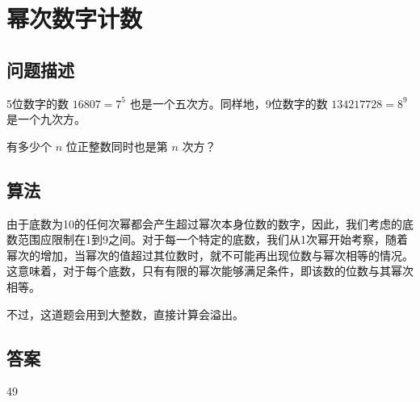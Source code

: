 \section{幂次数字计数}\label{sec:problem63}
\subsection{问题描述}
\begin{tcolorbox}
	5位数字的数 \( 16807 = 7^5 \) 也是一个五次方。同样地，9位数字的数 \( 134217728 = 8^9 \) 是一个九次方。

	有多少个 \( n \) 位正整数同时也是第 \( n \) 次方？
\end{tcolorbox}

\subsection{算法}
由于底数为10的任何次幂都会产生超过幂次本身位数的数字，因此，我们考虑的底数范围应限制在1到9之间。对于每一个特定的底数，我们从1次幂开始考察，随着幂次的增加，当幂次的值超过其位数时，就不可能再出现位数与幂次相等的情况。这意味着，对于每个底数，只有有限的幂次能够满足条件，即该数的位数与其幂次相等。

不过，这道题会用到大整数，直接计算会溢出。
\subsection{答案}
49
